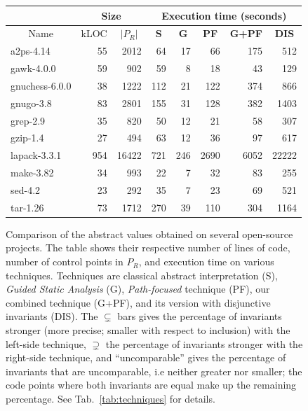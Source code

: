 \documentclass{llncs}
\begin{document}
\begin{figure}[h!]
      \centering
      \begin{tabular}{|l|r|r|r|r|r|r|r|} \hline
        \multicolumn{1}{|c|}{} &
        \multicolumn{2}{c|}{Size} &
        \multicolumn{5}{c|}{Execution time (seconds)} \\ \hline
        \multicolumn{1}{|c|}{Name} & 
        \multicolumn{1}{c|}{kLOC}  & 
        \multicolumn{1}{c|}{$|P_R|$}  &
        \multicolumn{1}{c|}{\textbf{S}} &
        \multicolumn{1}{c|}{\textbf{G}} &
        \multicolumn{1}{c|}{\textbf{PF}} &
        \multicolumn{1}{c|}{\textbf{G+PF}} &
	\multicolumn{1}{c|}{\textbf{DIS}} \\ 
        \hline
a2ps-4.14      & 55  & 2012  & 64  & 17  & 66   & 175  & 512   \\
gawk-4.0.0     & 59  & 902   & 59  & 8   & 18   & 43   & 129   \\
gnuchess-6.0.0 & 38  & 1222  & 112 & 21  & 122  & 374  & 866   \\
gnugo-3.8      & 83  & 2801  & 155 & 31  & 128  & 382  & 1403  \\
grep-2.9       & 35  & 820   & 50  & 12  & 21   & 58   & 307   \\
gzip-1.4       & 27  & 494   & 63  & 12  & 36   & 97   & 617   \\
lapack-3.3.1   & 954 & 16422 & 721 & 246 & 2690 & 6052 & 22222 \\
make-3.82      & 34  & 993   & 22  & 7   & 32   & 83   & 255   \\
sed-4.2        & 23  & 292   & 35  & 7   & 23   & 69   & 521   \\
tar-1.26       & 73  & 1712  & 270 & 39  & 110  & 304  & 1164  \\
	\hline
      \end{tabular}
      \label{fig:projects}

    
  \vspace{-20pt}
  \caption{Comparison of the abstract values obtained on several open-source projects. The table shows
  their respective number of lines of code, number of control points in $P_R$, and execution time
  on various techniques.
  Techniques are classical abstract
  interpretation (S), \emph{Guided Static
  Analysis} (G), \emph{Path-focused} technique (PF), our combined technique
  (G+PF), and its version with disjunctive invariants (DIS).
  The $\subsetneq$ bars gives the percentage of invariants stronger (more precise; smaller with respect to inclusion) with the left-side technique,
$\supsetneq$ the percentage of invariants stronger with the right-side technique,
and ``uncomparable'' gives the percentage of invariants that are uncomparable, i.e
neither greater nor smaller;
the code points where both invariants are equal make up the remaining percentage. See Tab.~\ref{tab:techniques} for details.}
  \label{fig:techniques}
\end {figure}
\end{document}
